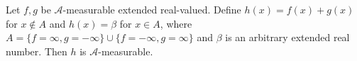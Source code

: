 Let $f, g$ be $\mathcal{A}$-measurable extended real-valued. Define $h(x) = f(x) + g(x)$ for $x \notin A$ and $h(x) = \beta$ for $x \in A$, where $A = \{f = \infty, g = -\infty\} \cup \{f = -\infty, g = \infty\}$ and $\beta$ is an arbitrary extended real number. Then $h$ is $\mathcal{A}$-measurable.